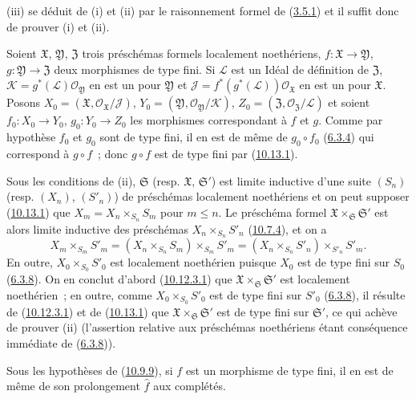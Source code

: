 (iii) se déduit de (i) et (ii) par le raisonnement formel de
(\hyperref[I.3.5.1-fr]{3.5.1}) et il suffit donc de prouver (i) et (ii).

Soient $\mathfrak{X}$, $\mathfrak{Y}$, $\mathfrak{Z}$ trois préschémas
formels localement noethériens, $f:\mathfrak{X}\to\mathfrak{Y}$,
$g:\mathfrak{Y}\to\mathfrak{Z}$ deux morphismes de type fini. Si
$\mathscr{L}$ est un Idéal de définition de $\mathfrak{Z}$,
$\mathscr{K}=g^*(\mathscr{L})\mathscr{O}_{\mathfrak{Y}}$ en est un pour
$\mathfrak{Y}$ et
$\mathscr{J}=f^*(g^*(\mathscr{L}))\mathscr{O}_{\mathfrak{X}}$ en est un
pour $\mathfrak{X}$. Posons
$X_0=(\mathfrak{X},\mathscr{O}_{\mathfrak{X}}/\mathscr{J})$,
$Y_0=(\mathfrak{Y},\mathscr{O}_{\mathfrak{Y}}/\mathscr{K})$,
$Z_0=(\mathfrak{Z},\mathscr{O}_{\mathfrak{Z}}/\mathscr{L})$ et soient
$f_0:X_0\to Y_0$, $g_0:Y_0\to Z_0$ les morphismes correspondant à $f$ et
$g$. Comme par hypothèse $f_0$ et $g_0$ sont de type fini, il en est de même
de $g_0\circ f_0$ (\hyperref[I.6.3.4-fr]{6.3.4}) qui correspond à
$g\circ f$~; donc $g\circ f$ est de type fini par
(\hyperref[I.10.13.1-fr]{10.13.1}).

Sous les conditions de (ii), $\mathfrak{S}$ (resp. $\mathfrak{X}$,
$\mathfrak{S}'$) est limite inductive d'une suite $(S_n)$ (resp. $(X_n)$,
$(S'_n)$) de préschémas localement noethériens et on peut supposer
(\hyperref[I.10.13.1-fr]{10.13.1}) que
$X_m=X_n\times_{S_n}S_m$ pour $m\leq n$. Le préschéma formel
$\mathfrak{X}\times_{\mathfrak{S}}\mathfrak{S}'$ est alors limite inductive
des préschémas $X_n\times_{S_n}S'_n$
(\hyperref[I.10.7.4-fr]{10.7.4}), et on a
\[
  X_m\times_{S_m}S'_m
  =(X_n\times_{S_n}S_m)\times_{S_m}S'_m
  =(X_n\times_{S_n}S'_n)\times_{S'_n}S'_m.
\]
En outre, $X_0\times_{S_0}S'_0$ est localement noethérien puisque $X_0$
est de type fini sur $S_0$ (\hyperref[I.6.3.8-fr]{6.3.8}). On en conclut
d'abord (\hyperref[I.10.12.3.1-fr]{10.12.3.1}) que
$\mathfrak{X}\times_{\mathfrak{S}}\mathfrak{S}'$ est localement
noethérien~; en outre, comme $X_0\times_{S_0}S'_0$ est de type fini sur
$S'_0$ (\hyperref[I.6.3.8-fr]{6.3.8}), il résulte de
(\hyperref[I.10.12.3.1-fr]{10.12.3.1}) et de
(\hyperref[I.10.13.1-fr]{10.13.1}) que
$\mathfrak{X}\times_{\mathfrak{S}}\mathfrak{S}'$ est de type fini sur
$\mathfrak{S}'$, ce qui achève de prouver (ii) (l'assertion relative aux
préschémas noethériens étant conséquence immédiate de
(\hyperref[I.6.3.8-fr]{6.3.8})).

\begin{corollary}[10.13.6]
\label{I.10.13.6-fr}
Sous les hypothèses de (\hyperref[I.10.9.9-fr]{10.9.9}), si $f$ est un
morphisme de type fini, il en est de même de son prolongement $\widehat f$
aux complétés.
\end{corollary}


